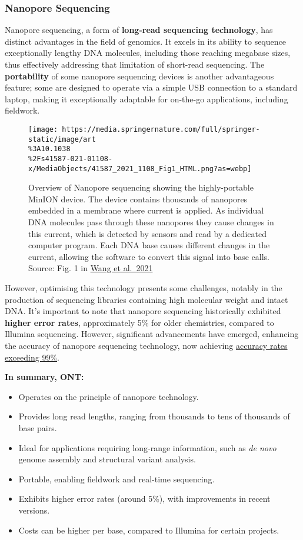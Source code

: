 \documentclass[
]{article}
\providecommand{\tightlist}{%
  \setlength{\itemsep}{0pt}\setlength{\parskip}{0pt}}
\begin{document}
\subsubsection{Nanopore Sequencing}\label{nanopore-sequencing}

Nanopore sequencing, a form of \textbf{long-read sequencing technology},
has distinct advantages in the field of genomics. It excels in its
ability to sequence exceptionally lengthy DNA molecules, including those
reaching megabase sizes, thus effectively addressing that limitation of
short-read sequencing. The \textbf{portability} of some nanopore
sequencing devices is another advantageous feature; some are designed to
operate via a simple USB connection to a standard laptop, making it
exceptionally adaptable for on-the-go applications, including fieldwork.

\begin{figure}
\centering
\texttt{[image: https://media.springernature.com/full/springer-static/image/art\\\%3A10.1038\\\%2Fs41587-021-01108-x/MediaObjects/41587\_2021\_1108\_Fig1\_HTML.png?as=webp]}
\caption{Overview of Nanopore sequencing showing the highly-portable
MinION device. The device contains thousands of nanopores embedded in a
membrane where current is applied. As individual DNA molecules pass
through these nanopores they cause changes in this current, which is
detected by sensors and read by a dedicated computer program. Each DNA
base causes different changes in the current, allowing the software to
convert this signal into base calls. Source: Fig. 1 in
\href{https://doi.org/10.1038/s41587-021-01108-x}{Wang et al.~2021}}
\end{figure}

However, optimising this technology presents some challenges, notably in
the production of sequencing libraries containing high molecular weight
and intact DNA. It's important to note that nanopore sequencing
historically exhibited \textbf{higher error rates}, approximately 5\%
for older chemistries, compared to Illumina sequencing. However,
significant advancements have emerged, enhancing the accuracy of
nanopore sequencing technology, now achieving
\href{https://nanoporetech.com/accuracy}{accuracy rates exceeding 99\%}.

\textbf{In summary, ONT:}

\begin{itemize}
\tightlist
\item
  Operates on the principle of nanopore technology.
\item
  Provides long read lengths, ranging from thousands to tens of
  thousands of base pairs.
\item
  Ideal for applications requiring long-range information, such as
  \emph{de novo} genome assembly and structural variant analysis.
\item
  Portable, enabling fieldwork and real-time sequencing.
\item
  Exhibits higher error rates (around 5\%), with improvements in recent
  versions.
\item
  Costs can be higher per base, compared to Illumina for certain
  projects.
\end{itemize}
\end{document}
